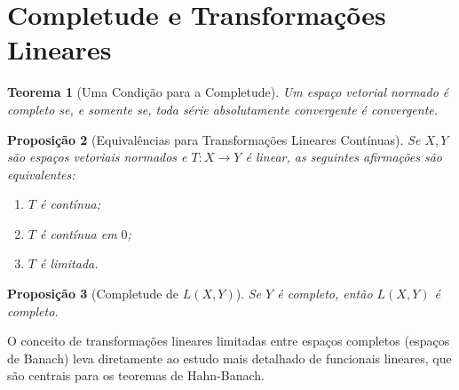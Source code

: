 \documentclass[12pt]{article}
\newtheorem{theorem}{Teorema}[section]
\newtheorem{proposition}[theorem]{Proposição}
\begin{document}
\section{Completude e Transformações Lineares}
\begin{multicols}{3}
\begin{theorem}[Uma Condição para a Completude]
Um espaço vetorial normado é completo se, e somente se, toda série absolutamente convergente é convergente.
\end{theorem}

\begin{proposition}[Equivalências para Transformações Lineares Contínuas]
Se $X, Y$ são espaços vetoriais normados e $T: X \to Y$ é linear, as seguintes afirmações são equivalentes:
\begin{enumerate}[label=(\alph*)]
    \item $T$ é contínua;
    \item $T$ é contínua em $0$;
    \item $T$ é limitada.
\end{enumerate}
\end{proposition}

\begin{proposition}[Completude de $L(X, Y)$]
Se $Y$ é completo, então $L(X, Y)$ é completo.
\end{proposition}
O conceito de transformações lineares limitadas entre espaços completos (espaços de Banach) leva diretamente ao estudo mais detalhado de funcionais lineares, que são centrais para os teoremas de Hahn-Banach.
\end{multicols}
\newpage
\end{document}
